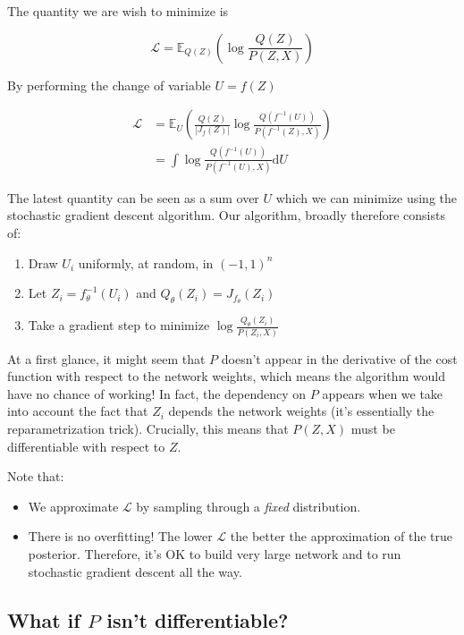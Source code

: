 \documentclass{article}
\begin{document}
The quantity we are wish to minimize is

\[
  \mathcal{L} = \mathbb{E}_{Q(Z)} \left(\log \frac{Q(Z)}{P(Z,X)} \right)
\]

By performing the change of variable $U = f(Z)$

\[
  \begin{aligned}
    \mathcal{L} &= \mathbb{E}_{U} \left(\frac{Q(Z)}{|J_{f}(Z)|}
      \log \frac{Q(f^{-1}(U))}{P(f^{-1}(Z),X)}\right)\\
                &= \int \log \frac{Q(f^{-1}(U))}{P(f^{-1}(U),X)} \mathrm{d}U
  \end{aligned}
\]

The latest quantity can be seen as a sum over $U$ which we can minimize using
the stochastic gradient descent algorithm. Our algorithm, broadly therefore
consists of:

\begin{enumerate}
\item Draw \(U_i\) uniformly, at random, in \((-1,1)^n\)
\item Let \(Z_i = f_{\theta}^{-1}(U_i)\) and \(Q_\theta(Z_i) = J_{f_\theta}(Z_i)\)
\item Take a gradient step to minimize \(\log \frac{Q_\theta(Z_i)}{P(Z_i,X)}\)
\end{enumerate}

At a first glance, it might seem that \(P\) doesn't appear in the derivative
of the cost function with respect to the network weights, which means the
algorithm would have no chance of working! In fact, the dependency on
\(P\) appears when we take into account the fact that \(Z_i\) depends the
network weights (it's essentially the reparametrization trick).
Crucially, this means that \(P(Z,X)\) must be differentiable with respect to
\(Z\).

Note that:

\begin{itemize}
\item We approximate \(\mathcal{L}\) by sampling through a \emph{fixed} distribution.
\item There is no overfitting! The lower \(\mathcal{L}\) the better the approximation
  of the true posterior. Therefore, it's OK to build very large network and to run
  stochastic gradient descent all the way.
\end{itemize}

\subsection{What if \(P\) isn't differentiable?}
\end{document}
